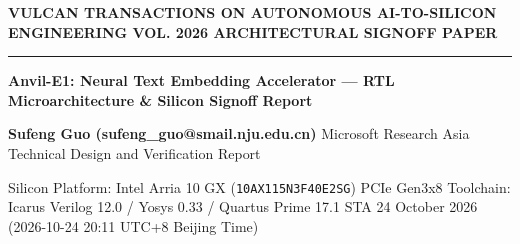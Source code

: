 \documentclass[11pt,a4paper]{article}
\begin{document}
{\scriptsize\sffamily\textcolor{vulcan}{\textbf{VULCAN TRANSACTIONS ON AUTONOMOUS AI-TO-SILICON ENGINEERING \hfill VOL. 2026 \textperiodcentered{} ARCHITECTURAL SIGNOFF PAPER}}\par}

\vspace{1pt}\textcolor{vulcan}{\rule{\textwidth}{1.2pt}}\vspace{4pt}

\begin{center}

{\sffamily\LARGE\bfseries Anvil-E1: Neural Text Embedding Accelerator — RTL Microarchitecture \& Silicon Signoff Report\par}\vspace{3pt}

{\small\sffamily\textbf{Sufeng Guo (\allowbreak{}sufeng\_\allowbreak{}guo@smail.nju.edu.cn)\allowbreak{}} \textperiodcentered{} Microsoft Research Asia \textperiodcentered{} Technical Design and Verification Report\par}\vspace{1pt}

{\scriptsize\sffamily\textcolor{black!75}{Silicon Platform: Intel Arria 10 GX (\texttt{10AX115N3F40E2SG}) PCIe Gen3x8 \textperiodcentered{} Toolchain: Icarus Verilog 12.0 / Yosys 0.33 / Quartus Prime 17.1 STA \textperiodcentered{} 24 October 2026 (\allowbreak{}2026-10-24 20:11 UTC+\allowbreak{}8 Beijing Time)\allowbreak{}}\par}

\end{center}\vspace{2pt}
\end{document}

